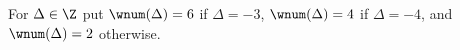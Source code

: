 For $\Delta\in\Z$ put $\wnum(\Delta)=6$ if $\Delta=-3$, $\wnum(\Delta)=4$ if $\Delta=-4$, and $\wnum(\Delta)=2$ otherwise.
